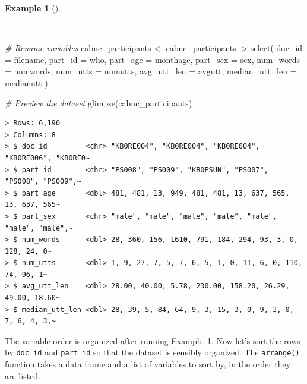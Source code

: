 \documentclass[
  letterpaper,
]{latex/krantz}
\newenvironment{Shaded}{\begin{snugshade}}{\end{snugshade}}
\newcommand{\AttributeTok}[1]{\textcolor[rgb]{0.00,0.00,0.00}{#1}}
\newcommand{\CommentTok}[1]{\textcolor[rgb]{0.00,0.00,0.00}{\textit{#1}}}
\newcommand{\FunctionTok}[1]{\textcolor[rgb]{0.00,0.00,0.00}{#1}}
\newcommand{\NormalTok}[1]{\textcolor[rgb]{0.00,0.00,0.00}{#1}}
\newcommand{\OtherTok}[1]{\textcolor[rgb]{0.00,0.00,0.00}{#1}}
\newcommand{\SpecialCharTok}[1]{\textcolor[rgb]{0.00,0.00,0.00}{#1}}
\theoremstyle{definition}
\newtheorem{example}{Example}[chapter]
\theoremstyle{remark}
\begin{document}
\begin{example}[]\protect\hypertarget{exm-cd-cabnc-rename-vars}{}\label{exm-cd-cabnc-rename-vars}

~

\begin{Shaded}
\begin{Highlighting}[]
\CommentTok{\# Rename variables}
\NormalTok{cabnc\_participants }\OtherTok{\textless{}{-}}
\NormalTok{  cabnc\_participants }\SpecialCharTok{|\textgreater{}}
  \FunctionTok{select}\NormalTok{(}
    \AttributeTok{doc\_id =}\NormalTok{ filename,}
    \AttributeTok{part\_id =}\NormalTok{ who,}
    \AttributeTok{part\_age =}\NormalTok{ monthage,}
    \AttributeTok{part\_sex =}\NormalTok{ sex,}
    \AttributeTok{num\_words =}\NormalTok{ numwords,}
    \AttributeTok{num\_utts =}\NormalTok{ numutts,}
    \AttributeTok{avg\_utt\_len =}\NormalTok{ avgutt,}
    \AttributeTok{median\_utt\_len =}\NormalTok{ medianutt}
\NormalTok{  )}

\CommentTok{\# Preview the dataset}
\FunctionTok{glimpse}\NormalTok{(cabnc\_participants)}
\end{Highlighting}
\end{Shaded}

\begin{verbatim}
> Rows: 6,190
> Columns: 8
> $ doc_id         <chr> "KB0RE004", "KB0RE004", "KB0RE004", "KB0RE006", "KB0RE0~
> $ part_id        <chr> "PS008", "PS009", "KB0PSUN", "PS007", "PS008", "PS009",~
> $ part_age       <dbl> 481, 481, 13, 949, 481, 481, 13, 637, 565, 13, 637, 565~
> $ part_sex       <chr> "male", "male", "male", "male", "male", "male", "male",~
> $ num_words      <dbl> 28, 360, 156, 1610, 791, 184, 294, 93, 3, 0, 128, 24, 0~
> $ num_utts       <dbl> 1, 9, 27, 7, 5, 7, 6, 5, 1, 0, 11, 6, 0, 110, 74, 96, 1~
> $ avg_utt_len    <dbl> 28.00, 40.00, 5.78, 230.00, 158.20, 26.29, 49.00, 18.60~
> $ median_utt_len <dbl> 28, 39, 5, 84, 64, 9, 3, 15, 3, 0, 9, 3, 0, 7, 6, 4, 3,~
\end{verbatim}

\end{example}

The variable order is organized after running
Example~\ref{exm-cd-cabnc-rename-vars}. Now let's sort the rows by
\texttt{doc\_id} and \texttt{part\_id} so that the dataset is sensibly
organized. The \texttt{arrange()} function takes a data frame and a list
of variables to sort by, in the order they are listed.
\end{document}
